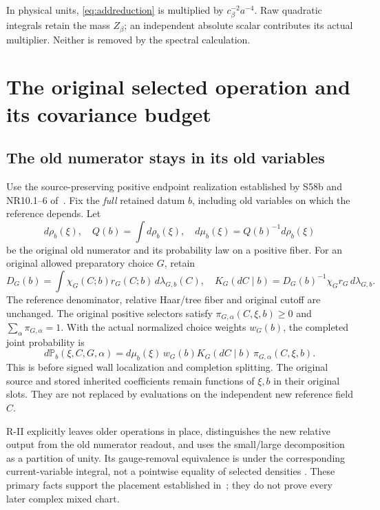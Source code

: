 \documentclass[11pt,letterpaper]{article}
\theoremstyle{remark}\newtheorem{remark}[theorem]{Remark}
\newcommand{\cB}{c_\beta}\newcommand{\dd}{\,d}
\begin{document}
In physical units, \eqref{eq:addreduction} is multiplied by $\cB^{-2}a^{-4}$. Raw quadratic integrals retain the mass $Z_\beta$; an independent absolute scalar contributes its actual multiplier. Neither is removed by the spectral calculation.

\section{The original selected operation and its covariance budget}

\subsection{The old numerator stays in its old variables}

Use the source-preserving positive endpoint realization established by S58b and NR10.1--6 of~\cite[pp.~601--602, 1100--1101]{W}. Fix the \emph{full} retained datum $b$, including old variables on which the reference depends. Let
\[
 d\rho_b(\xi),\quad Q(b)=\int d\rho_b(\xi),\quad
 d\mu_b(\xi)=Q(b)^{-1}d\rho_b(\xi)
\]
be the original old numerator and its probability law on a positive fiber. For an original allowed preparatory choice $G$, retain
\[
 D_G(b)=\int\chi_G(C;b)r_G(C;b)\dd\lambda_{G,b}(C),\quad
 K_G(dC\mid b)=D_G(b)^{-1}\chi_Gr_G\dd\lambda_{G,b}.
\]
The reference denominator, relative Haar/tree fiber and original cutoff are unchanged. The original positive selectors satisfy
$\pi_{G,\alpha}(C,\xi,b)\ge0$ and $\sum_\alpha\pi_{G,\alpha}=1$.
With the actual normalized choice weights $w_G(b)$, the completed joint probability is
\begin{equation}\label{eq:actualjoint}
 d\mathbb P_b(\xi,C,G,\alpha)
 =d\mu_b(\xi)\,w_G(b)K_G(dC\mid b)\,
       \pi_{G,\alpha}(C,\xi,b).
\end{equation}
This is before signed wall localization and completion splitting. The original source and stored inherited coefficients remain functions of $\xi,b$ in their original slots. They are not replaced by evaluations on the independent new reference field $C$.

R-II explicitly leaves older operations in place, distinguishes the new relative output from the old numerator readout, and uses the small/large decomposition as a partition of unity. Its gauge-removal equivalence is under the corresponding current-variable integral, not a pointwise equality of selected densities \cite{RII}. These primary facts support the placement established in~\cite[pp.~601--602, 1100--1101]{W}; they do not prove every later complex mixed chart.
\end{document}
